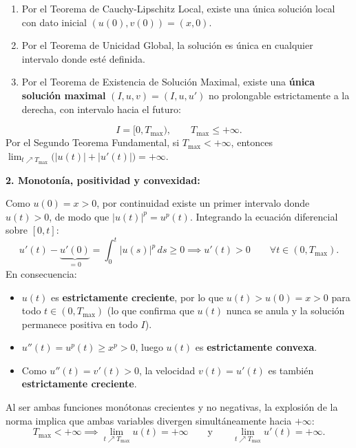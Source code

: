 {\begin{enumerate}[label=\Roman*)]
        \item Por el Teorema de Cauchy-Lipschitz Local, existe una única solución local con dato inicial $(u(0), v(0)) = (x, 0)$.
        \item Por el Teorema de Unicidad Global, la solución es única en cualquier intervalo donde esté definida.
        \item Por el Teorema de Existencia de Solución Maximal, existe una \textbf{única solución maximal} $(I, u, v) = (I, u, u')$ no prolongable estrictamente a la derecha, con intervalo hacia el futuro:
    \end{enumerate}
    \[
        I = [0, T_{\max}), \qquad T_{\max} \le +\infty.
    \]
    Por el Segundo Teorema Fundamental, si $T_{\max} < +\infty$, entonces $\lim_{t \nearrow T_{\max}} \bigl( |u(t)| + |u'(t)| \bigr) = +\infty$.

    \medskip

    \textbf{2. Monotonía, positividad y convexidad:}

    Como $u(0) = x > 0$, por continuidad existe un primer intervalo donde $u(t) > 0$, de modo que $|u(t)|^p = u^p(t)$. Integrando la ecuación diferencial sobre $[0, t]$:
    \[
        u'(t) - \underbrace{u'(0)}_{= 0} = \int_0^t |u(s)|^p \, ds \ge 0 \implies u'(t) > 0 \qquad \forall t \in (0, T_{\max}).
    \]
    En consecuencia:
    \begin{itemize}
        \item $u(t)$ es \textbf{estrictamente creciente}, por lo que $u(t) > u(0) = x > 0$ para todo $t \in (0, T_{\max})$ (lo que confirma que $u(t)$ nunca se anula y la solución permanece positiva en todo $I$).
        \item $u''(t) = u^p(t) \ge x^p > 0$, luego $u(t)$ es \textbf{estrictamente convexa}.
        \item Como $u''(t) = v'(t) > 0$, la velocidad $v(t) = u'(t)$ es también \textbf{estrictamente creciente}.
    \end{itemize}
    Al ser ambas funciones monótonas crecientes y no negativas, la explosión de la norma implica que ambas variables divergen simultáneamente hacia $+\infty$:
    \[
        T_{\max} < +\infty \implies \lim_{t \nearrow T_{\max}} u(t) = +\infty \qquad \text{y} \qquad \lim_{t \nearrow T_{\max}} u'(t) = +\infty.
    \]

    \begin{center}
\end{center}}
